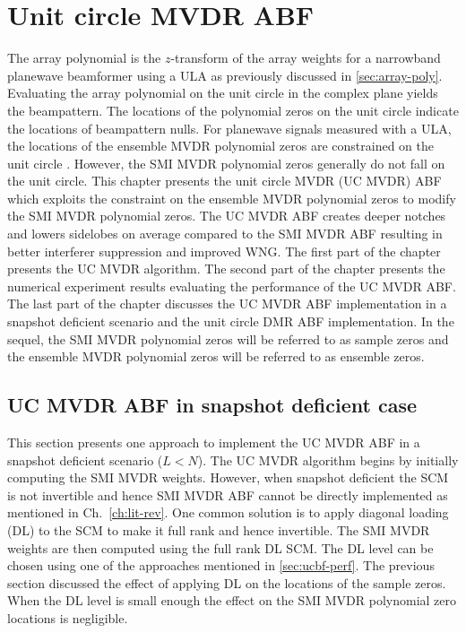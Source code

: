 \chapter{Unit circle MVDR ABF}
\label{ch:ucmvdr}
The array polynomial is the $z$-transform of the array weights for a
narrowband planewave beamformer using a ULA as previously discussed in
\ref{sec:array-poly}. Evaluating the array polynomial on the unit
circle in the complex plane yields the beampattern. The locations of
the polynomial zeros on the unit circle indicate the locations of
beampattern nulls. For planewave signals measured with a ULA, the
locations of the ensemble MVDR polynomial zeros are constrained on the
unit circle \cite{steinhardt2004stap,tuladhar2015ucmvdr}. However, the
SMI MVDR polynomial zeros generally do not fall on the unit
circle. This chapter presents the unit circle MVDR (UC MVDR) ABF which
exploits the constraint on the ensemble MVDR polynomial zeros to
modify the SMI MVDR polynomial zeros. The UC MVDR ABF creates deeper
notches and lowers sidelobes on average compared to the SMI MVDR ABF
resulting in better interferer suppression and improved WNG. The first
part of the chapter presents the UC MVDR algorithm. The second part of
the chapter presents the numerical experiment results evaluating the
performance of the UC MVDR ABF. The last part of the chapter discusses
the UC MVDR ABF implementation in a snapshot deficient scenario and
the unit circle DMR ABF implementation. In the sequel, the SMI MVDR
polynomial zeros will be referred to as sample zeros and the ensemble
MVDR polynomial zeros will be referred to as ensemble zeros.




\section{UC MVDR ABF in snapshot deficient case}
\label{sec:uc-mvdr-snapshot-def}
This section presents one approach to implement the UC MVDR ABF in a
snapshot deficient scenario ($L < N$). The UC MVDR algorithm begins by
initially computing the SMI MVDR weights. However, when snapshot
deficient the SCM is not invertible and hence SMI MVDR ABF cannot be
directly implemented as mentioned in Ch.~\ref{ch:lit-rev}. One common
solution is to apply diagonal loading (DL) to the SCM to make it full
rank and hence invertible. The SMI MVDR weights are then computed
using the full rank DL SCM. The DL level can be chosen using one of the
approaches mentioned in \sect{}\ref{sec:ucbf-perf}. The previous
section discussed the effect of applying DL on the locations of the
sample zeros. When the DL level is small enough the
effect on the SMI MVDR polynomial zero locations is negligible.

